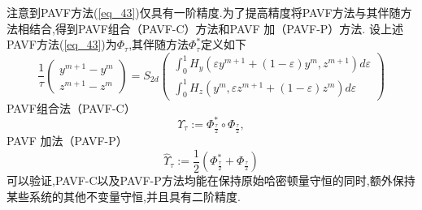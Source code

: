 注意到PAVF方法(\ref{eq_43})仅具有一阶精度\cite{caiPartitionedAveragedVector2018}.为了提高精度将PAVF方法与其伴随方法相结合,得到PAVF组合（PAVF-C）方法和PAVF 加（PAVF-P）方法.
设上述PAVF方法(\ref{eq_43})为$\Phi_{\tau}$,其伴随方法$\Phi_{\tau}^{*}$定义如下
\begin{equation}
\frac{1}{\tau}\left(\begin{array}{c}
y^{m+1}-y^{m} \\
z^{m+1}-z^{m}
\end{array}\right)=S_{2 d}\left(\begin{array}{c}
\int_{0}^{1} H_{y}\left(\varepsilon y^{m+1}+(1-\varepsilon) y^{m}, z^{m+1}\right) d \varepsilon \\
\int_{0}^{1} H_{z}\left(y^{m}, \varepsilon z^{m+1}+(1-\varepsilon) z^{m}\right) d \varepsilon
\end{array}\right)
\label{eq_44}\end{equation}
PAVF组合法（PAVF-C）
\begin{equation}
\Upsilon_{\tau}:=\Phi_{\frac{\tau}{2}}^{*} \circ \Phi_{\frac{\tau}{2}},
\label{eq_45}\end{equation}
PAVF 加法（PAVF-P）
\begin{equation}
\hat{\Upsilon}_{\tau}:=\frac{1}{2}\left(\Phi_{\frac{\tau}{2}}^{*}+\Phi_{\frac{\tau}{2}}\right)
\label{eq_46}\end{equation}
可以验证,PAVF-C以及PAVF-P方法均能在保持原始哈密顿量守恒的同时,额外保持某些系统的其他不变量守恒,并且具有二阶精度\cite{caiPartitionedAveragedVector2018}.




